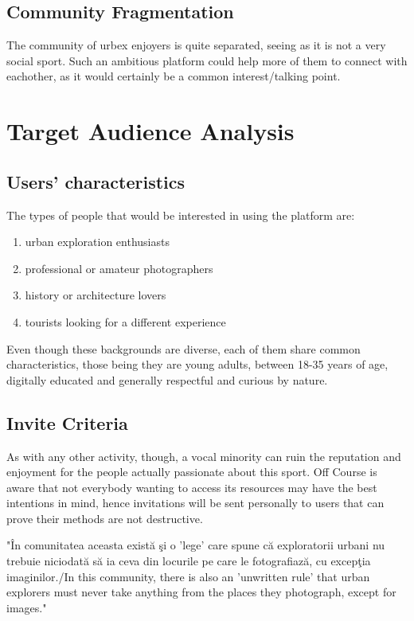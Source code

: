 \documentclass[12pt,a4paper]{report}
\begin{document}
\subsection{Community Fragmentation}
The community of urbex enjoyers is quite separated, seeing as it is not a very social sport. Such an ambitious platform could help more of them to connect with eachother, as it would certainly be a common interest/talking point.

\section{Target Audience Analysis}
\subsection{Users' characteristics}
The types of people that would be interested in using the platform are:
\begin{enumerate}
    \item urban exploration enthusiasts
    \item professional or amateur photographers
    \item history or architecture lovers
    \item tourists looking for a different experience
\end{enumerate}

Even though these backgrounds are diverse, each of them share common characteristics, those being they are young adults, between 18-35 years of age, digitally educated and generally respectful and curious by nature.

\subsection{Invite Criteria}
As with any other activity, though, a vocal minority can ruin the reputation and enjoyment for the people actually passionate about this sport. Off Course is aware that not everybody wanting to access its resources may have the best intentions in mind, hence invitations will be sent personally to users that can prove their methods are not destructive.

"În comunitatea aceasta există şi o 'lege' care spune că exploratorii urbani nu trebuie niciodată să ia ceva din locurile pe care le fotografiază, cu excepţia imaginilor./In this community, there is also an 'unwritten rule' that urban explorers must never take anything from the places they photograph, except for images."~\cite{articleUrbexRomania}
\end{document}
